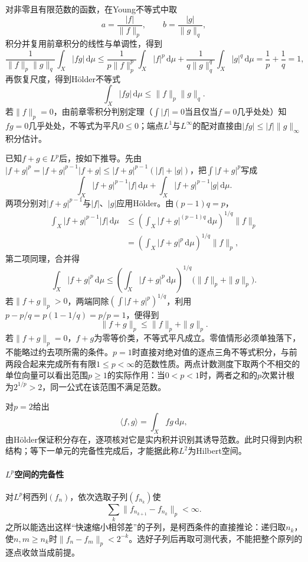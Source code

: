 对非零且有限范数的函数，在Young不等式中取
\[
  a=\frac{|f|}{\|f\|_p},\qquad b=\frac{|g|}{\|g\|_q},
\]
积分并复用前章积分的线性与单调性，得到
\[
  \frac{1}{\|f\|_p\|g\|_q}\int_X|fg|\,\mathrm d\mu
  \le\frac{1}{p\|f\|_p^p}\int_X|f|^p\,\mathrm d\mu
  +\frac{1}{q\|g\|_q^q}\int_X|g|^q\,\mathrm d\mu
  =\frac1p+\frac1q=1,
\]
再恢复尺度，得到Hölder不等式
\[
  \int_X|fg|\,\mathrm d\mu\le\|f\|_p\|g\|_q.
\]
若$\|f\|_p=0$，由前章零积分判别定理（$\int|f|=0$当且仅当$f=0$几乎处处）知$fg=0$几乎处处，不等式为平凡$0\le0$；端点$L^1$与$L^\infty$的配对直接由$|fg|\le|f|\|g\|_\infty$积分估计。

已知$f+g\in L^p$后，按如下推导。先由$|f+g|^p=|f+g|^{p-1}|f+g|\le|f+g|^{p-1}(|f|+|g|)$，把$\int|f+g|^p$写成
\[
  \int_X|f+g|^{p-1}|f|\,\mathrm d\mu
  +\int_X|f+g|^{p-1}|g|\,\mathrm d\mu.
\]
两项分别对$|f+g|^{p-1}$与$|f|$、$|g|$应用Hölder。由$(p-1)q=p$，
\[
\begin{aligned}
  \int_X|f+g|^{p-1}|f|\,\mathrm d\mu
  &\le\left(\int_X|f+g|^{(p-1)q}\,\mathrm d\mu\right)^{1/q}\|f\|_p\\
  &=\left(\int_X|f+g|^p\,\mathrm d\mu\right)^{1/q}\|f\|_p,
\end{aligned}
\]
第二项同理，合并得
\[
  \int_X|f+g|^p\,\mathrm d\mu
  \le\left(\int_X|f+g|^p\,\mathrm d\mu\right)^{1/q}
  \bigl(\|f\|_p+\|g\|_p\bigr).
\]
若$\|f+g\|_p>0$，两端同除$(\int|f+g|^p)^{1/q}$，利用$p-p/q=p(1-1/q)=p/p=1$，便得到
\[
  \|f+g\|_p\le\|f\|_p+\|g\|_p.
\]
若$\|f+g\|_p=0$，$f+g$为零等价类，不等式平凡成立。零值情形必须单独落下，不能略过约去项所需的条件。$p=1$时直接对绝对值的逐点三角不等式积分，与前两段合起来完成所有有限$1\le p<\infty$的范数性质。两点计数测度下取两个不相交的单位向量可以看出范围$p\ge1$的实际作用：当$0<p<1$时，两者之和的$p$次累计根为$2^{1/p}>2$，同一公式在该范围不满足范数。

对$p=2$给出
\[
  \langle f,g\rangle=\int_Xfg\,\mathrm d\mu,
\]
由Hölder保证积分存在，逐项核对它是实内积并识别其诱导范数。此时只得到内积结构；等下一单元的完备性完成后，才能据此称$L^2$为Hilbert空间。

\paragraph{$L^p$空间的完备性}

对$L^p$柯西列$(f_n)$，依次选取子列$(f_{n_k})$使
\[
  \sum_k\|f_{n_{k+1}}-f_{n_k}\|_p<\infty.
\]
之所以能选出这样“快速缩小相邻差”的子列，是柯西条件的直接推论：递归取$n_k$，使$n,m\ge n_k$时$\|f_n-f_m\|_p<2^{-k}$。选好子列后再取可测代表，不能把整个原列的逐点收敛当成前提。

